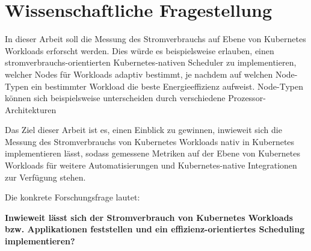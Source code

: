 \chapter{Wissenschaftliche Fragestellung}

In dieser Arbeit soll die Messung des Stromverbrauchs auf Ebene von Kubernetes Workloads erforscht werden.
Dies würde es beispielsweise erlauben, einen stromverbrauchs-orientierten Kubernetes-nativen
Scheduler zu implementieren, welcher Nodes für Workloads adaptiv bestimmt,
je nachdem auf welchen Node-Typen ein bestimmter Workload die beste Energieeffizienz aufweist.
Node-Typen können sich beispielsweise unterscheiden durch verschiedene
Prozessor-Architekturen
\bigskip

Das Ziel dieser Arbeit ist es, einen Einblick zu gewinnen, 
inwieweit sich die Messung des Stromverbrauchs von Kubernetes Workloads 
nativ in Kubernetes implementieren lässt,
sodass gemessene Metriken auf der Ebene von Kubernetes Workloads 
für weitere Automatisierungen und
Kubernetes-native Integrationen zur Verfügung stehen.
\bigskip


Die konkrete Forschungsfrage lautet:
\bigskip

\textbf{Inwieweit lässt sich der Stromverbrauch von Kubernetes Workloads bzw. Applikationen feststellen
	und ein effizienz-orientiertes Scheduling implementieren?}



